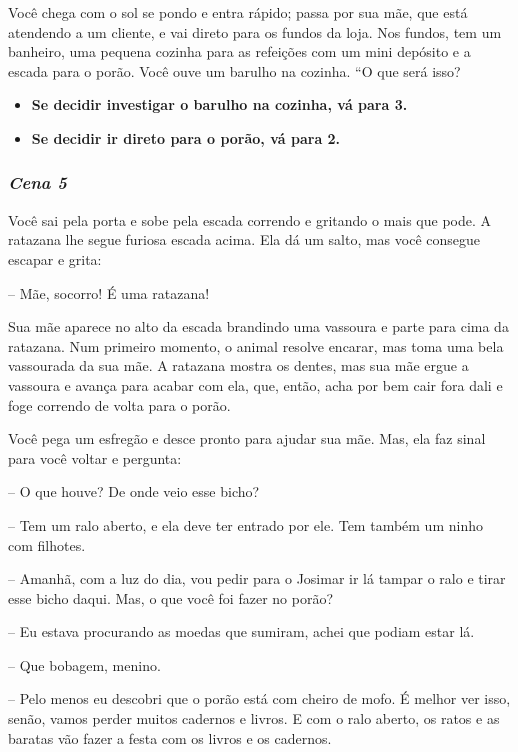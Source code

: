 Você chega com o sol se pondo e entra rápido; passa por sua mãe, que está atendendo a um cliente, e vai direto para os fundos da loja. Nos fundos, tem um banheiro, uma pequena cozinha para as refeições com um mini depósito e a escada para o porão. Você ouve um barulho na cozinha. “O que será isso?

\begin{itemize}
	\item \textbf{Se decidir investigar o barulho na cozinha, vá para 3.}
	\item \textbf{Se decidir ir direto para o porão, vá para 2.}
\end{itemize}

\bigskip\medskip

\subsubsection*{\textit{\textbf{Cena 5}}}
Você sai pela porta e sobe pela escada correndo e gritando o mais que pode. A ratazana lhe segue furiosa escada acima. Ela dá um salto, mas você consegue escapar e grita:

-- Mãe, socorro! É uma ratazana!

Sua mãe aparece no alto da escada brandindo uma vassoura e parte para cima da ratazana. Num primeiro momento, o animal resolve encarar, mas toma uma bela vassourada da sua mãe. A ratazana mostra os dentes, mas sua mãe ergue a vassoura e avança para acabar com ela, que, então, acha por bem cair fora dali e foge correndo de volta para o porão.

Você pega um esfregão e desce pronto para ajudar sua mãe. Mas, ela faz sinal para você voltar e pergunta:

-- O que houve? De onde veio esse bicho?

-- Tem um ralo aberto, e ela deve ter entrado por ele. Tem também um ninho com filhotes.

-- Amanhã, com a luz do dia, vou pedir para o Josimar ir lá tampar o ralo e tirar esse bicho daqui. Mas, o que você foi fazer no porão?

-- Eu estava procurando as moedas que sumiram, achei que podiam estar lá.

-- Que bobagem, menino.

-- Pelo menos eu descobri que o porão está com cheiro de mofo. É melhor ver isso, senão, vamos perder muitos cadernos e livros. E com o ralo aberto, os ratos e as baratas vão fazer a festa com os livros e os cadernos.

